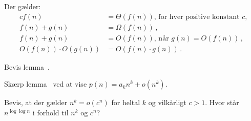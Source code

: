 \begin{lemma}[regneregler]
Der gælder: 
\begin{align*}
cf(n)&=\Theta(f(n))\text{, for hver positive konstant $c$,}\\
f(n)+g(n)&=\Omega(f(n))\,,\\
f(n)+g(n)&=O(f(n))\text{, når }g(n)=O(f(n))\,,\\
O(f(n)) \cdot O(g(n)) &= O(f(n) \cdot g(n))\,.
\end{align*}
\end{lemma} 


\begin{exerc}
Bevis lemma~.
\end{exerc}



\begin{exerc}
Skærp lemma~ ved at vise $p(n)=a_kn^k+o(n^k)$.
\end{exerc}

\begin{exerc} 
Bevis, at der gælder $n^k = o(c^n)$ for heltal $k$ og vilkårligt $c > 1$. 
Hvor står $n^{\log\log n}$ i forhold til $n^k$ og $c^n$?
\end{exerc}

